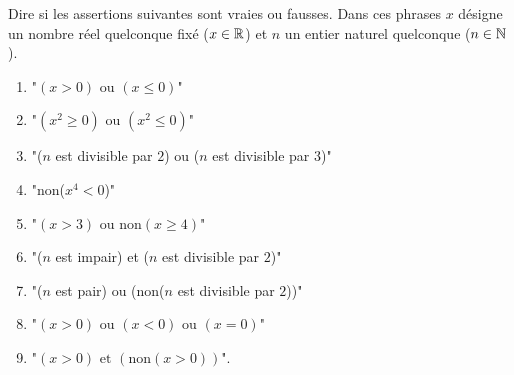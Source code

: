 \documentclass[11pt,class=report,crop=false]{standalone}
\begin{document}
\exercice{}
\enonce
Dire si les assertions suivantes sont vraies ou fausses.
Dans ces phrases $x$ désigne un nombre réel quelconque fixé  ($x \in \mathbb{R}$) et $n$ un entier naturel quelconque ($n \in \mathbb{N}$).

\begin{enumerate}
    \item "$(x > 0) \text{ ou } (x \le 0)$"    
    \item "$(x^2 \ge 0) \text{ ou } (x^2 \le 0)$"
    \item "($n$ est divisible par $2$) ou ($n$ est divisible par $3$)"
    \item "non($x^4 < 0$)"
    \item "$(x > 3) \text{ ou } \text{non}(x \ge 4)$"  
    \item "($n$ est impair) et ($n$ est divisible par $2$)"
    \item "($n$ est pair) ou (non($n$ est divisible par $2$))"
    \item "$(x>0)  \text{ ou } (x<0)  \text{ ou } (x=0)$"
    \item "$(x>0)  \text{ et } (\text{non}(x>0))$".
\end{enumerate}
 
\finenonce

\noindication
\end{document}
